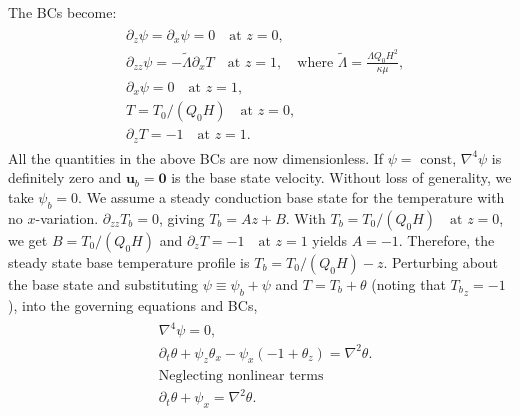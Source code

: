 \documentclass{article}
\begin{document}
The BCs become:
\begin{align}\label{eq:marangoni_convect_bcs_dimless}
 \begin{split}
  & \partial_{z}\psi = \partial_{x}\psi = 0 \quad \textrm{at } z = 0,\\
  & \partial_{zz} \psi = -\tilde{\Lambda}\partial_{x}T 
  \quad \textrm{at } z = 1, \quad \textrm{where } \tilde{\Lambda} = \frac{\Lambda Q_{0}H^{2}}{\kappa \mu},\\
  & \partial_{x}\psi = 0 \quad \textrm{at } z = 1, \\
  & T=T_{0}/(Q_{0}H) \quad \textrm{at } z = 0, \\
  & \partial_{z}T = -1 \quad \textrm{at } z = 1.
 \end{split}
\end{align}
All the quantities in the above BCs are now dimensionless. If $\psi = \textrm{ const}$, $\nabla^{4}\psi$ is definitely zero and $\boldsymbol{u}_{b}=\boldsymbol{0}$ is the base state velocity. Without loss of generality, we take $\boxed{\psi_{b} = 0}$. 
We assume a steady conduction base state for the temperature with no $x$-variation. $\partial_{zz}T_{b} = 0$, giving $T_{b} = Az + B$. With $T_{b}= T_{0}/(Q_{0}H) \quad \textrm{at } z = 0$, we get $B =T_{0}/(Q_{0}H)$ and $\partial_{z}T = -1 \quad \textrm{at } z = 1$ yields $A=-1$. Therefore, the steady state base temperature profile is $\boxed{T_{b} = T_{0}/(Q_{0}H) - z}$.  
%
Perturbing about the base state and substituting $\psi \equiv \psi_{b} + \psi$ and $T = T_{b} + \theta$ (noting that ${T_{b}}_{z} = -1$), into the governing equations and BCs,
\begin{align}\label{eq:perturbation_eqns}
 \begin{split}
  & \boxed{\nabla^{4}\psi = 0},\\
  & \partial_{t}\theta + \psi_{z}\theta_{x} - \psi_{x}(-1 + \theta_{z}) = \nabla^{2}\theta. \\
  & \textrm{Neglecting nonlinear terms}\\
  &\boxed{\partial_{t}\theta + \psi_{x} = \nabla^{2}\theta}.
 \end{split}
\end{align}
\end{document}

